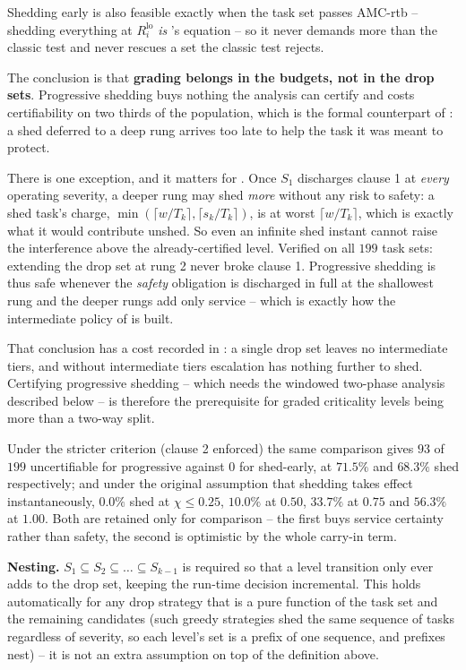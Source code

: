 Shedding early is also feasible exactly when the task set passes AMC-rtb --
shedding everything at $R_i^{\mathrm{lo}}$ \emph{is} 's
equation -- so it never demands more than the classic test and never rescues a
set the classic test rejects.

The conclusion is that \textbf{grading belongs in the budgets, not in the drop
sets}. Progressive shedding buys nothing the analysis can certify and costs
certifiability on two thirds of the population, which is the formal counterpart
of : a shed deferred to a deep rung arrives too late to help
the task it was meant to protect.

There is one exception, and it matters for . Once
$S_1$ discharges clause 1 at \emph{every} operating severity, a deeper rung may
shed \emph{more} without any risk to safety: a shed task's charge,
$\min(\lceil w/T_k \rceil, \lceil s_k/T_k \rceil)$, is at worst
$\lceil w/T_k \rceil$, which is exactly what it would contribute unshed. So
even an infinite shed instant cannot raise the interference above the
already-certified level. Verified on all $199$ task sets: extending the drop set
at rung 2 never broke clause 1. Progressive shedding is thus safe whenever the
\emph{safety} obligation is discharged in full at the shallowest rung and the
deeper rungs add only service -- which is exactly how the intermediate policy of
 is built.

That conclusion has a cost recorded in : a single drop set
leaves no intermediate tiers, and without intermediate tiers escalation has
nothing further to shed. Certifying progressive shedding -- which needs the
windowed two-phase analysis described below -- is therefore the prerequisite
for graded criticality levels being more than a two-way split.

Under the stricter criterion (clause 2 enforced) the same comparison gives
$93$ of $199$ uncertifiable for progressive against $0$ for shed-early, at
$71.5\%$ and $68.3\%$ shed respectively; and under the original assumption
that shedding takes effect instantaneously, $0.0\%$ shed at $\chi \leq 0.25$,
$10.0\%$ at $0.50$, $33.7\%$ at $0.75$ and $56.3\%$ at $1.00$. Both are
retained only for comparison -- the first buys service certainty rather than
safety, the second is optimistic by the whole carry-in term.

\textbf{Nesting.} $S_1 \subseteq S_2 \subseteq \dots \subseteq S_{k-1}$ is
required so that a level transition only ever adds to the drop set, keeping
the run-time decision incremental. This holds automatically for any drop
strategy that is a pure function of the task set and the remaining candidates
(such greedy strategies shed the same sequence of tasks regardless of
severity, so each level's set is a prefix of one sequence, and prefixes nest)
-- it is not an extra assumption on top of the definition above.

